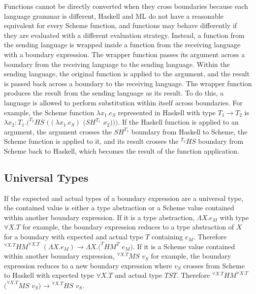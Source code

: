 Functions cannot be directly converted when they cross boundaries because each language grammar is different, Haskell and ML do not have a reasonable equivalent for every Scheme function, and functions may behave differently if they are evaluated with a different evaluation strategy.  Instead, a function from the sending language is wrapped inside a function from the receiving language with a boundary expression.  The wrapper function passes its argument across a boundary from the receiving language to the sending language.  Within the sending language, the original function is applied to the argument, and the result is passed back across a boundary to the receiving language.  The wrapper function produces the result from the sending language as its result.  To do this, a language is allowed to perform substitution within itself across boundaries.  For example, the Scheme function $\lambda x_{1}.e_{S}$ represented in Haskell with type $T_{1}\rightarrow T_{2}$ is $\lambda x_{2}:T_{1}.(^{T_{2}}HS$ $((\lambda x_{1}.e_{S})$ $(SH^{T_{1}}$ $x_{2})))$.  If the Haskell function is applied to an argument, the argument crosses the $SH^{T_{1}}$ boundary from Haskell to Scheme, the Scheme function is applied to it, and its result crosses the $^{T_{2}}HS$ boundary from Scheme back to Haskell, which becomes the result of the function application.

\subsection{Universal Types}

If the expected and actual types of a boundary expression are a universal type, the contained value is either a type abstraction or a Scheme value contained within another boundary expression.  If it is a type abstraction, $\Lambda X.e_{M}$ with type $\forall X.T$ for example, the boundary expression reduces to a type abstraction of $X$ for a boundary with expected and actual type $T$ containing $e_{M}$.  Therefore $^{\forall X.T}HM^{\forall X.T}$ $(\Lambda X.e_{M})\rightarrow\Lambda X.(^{T}HM^{T}$ $e_{M})$.  If it is a Scheme value contained within another boundary expression, $^{\forall X.T}MS$ $v_{S}$ for example, the boundary expression reduces to a new boundary expression where $v_{S}$ crosses from Scheme to Haskell with expected type $\forall X.T$ and actual type $TST$.  Therefore $^{\forall X.T}HM^{\forall X.T}$ $(^{\forall X.T}MS$ $v_{S})\rightarrow{^{\forall X.T}H}S$ $v_{S}$.

